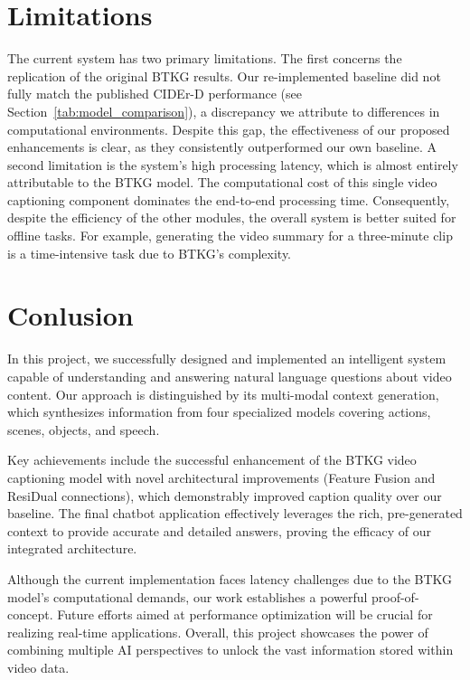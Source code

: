 \section{Limitations}

The current system has two primary limitations. The first concerns the replication of the original BTKG results. Our re-implemented baseline did not fully match the published CIDEr-D performance (see Section~\ref{tab:model_comparison}), a discrepancy we attribute to differences in computational environments. Despite this gap, the effectiveness of our proposed enhancements is clear, as they consistently outperformed our own baseline. A second limitation is the system's high processing latency, which is almost entirely attributable to the BTKG model. The computational cost of this single video captioning component dominates the end-to-end processing time. Consequently, despite the efficiency of the other modules, the overall system is better suited for offline tasks. For example, generating the video summary for a three-minute clip is a time-intensive task due to BTKG's complexity.



\section{Conlusion}

In this project, we successfully designed and implemented an intelligent system capable of understanding and answering natural language questions about video content. Our approach is distinguished by its multi-modal context generation, which synthesizes information from four specialized models covering actions, scenes, objects, and speech.

Key achievements include the successful enhancement of the BTKG video captioning model with novel architectural improvements (Feature Fusion and ResiDual connections), which demonstrably improved caption quality over our baseline. The final chatbot application effectively leverages the rich, pre-generated context to provide accurate and detailed answers, proving the efficacy of our integrated architecture.

Although the current implementation faces latency challenges due to the BTKG model's computational demands, our work establishes a powerful proof-of-concept. Future efforts aimed at performance optimization will be crucial for realizing real-time applications. Overall, this project showcases the power of combining multiple AI perspectives to unlock the vast information stored within video data.

